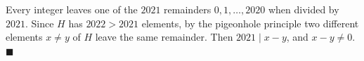 Every integer leaves one of the $2021$ remainders $0,1,\dots,2020$ when divided by $2021$. Since $H$ has $2022>2021$ elements, by the pigeonhole principle two different elements $x\ne y$ of $H$ leave the same remainder. Then $2021\mid x-y$, and $x-y\ne0$. $\blacksquare$
